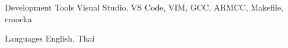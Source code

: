 \begin{cvskills}
  \cvskill
    {Development Tools} %
    {Visual Studio, VS Code, VIM, GCC, ARMCC, Makefile, cmocka} %

  \cvskill
    {Languages} %
    {English, Thai} %

\end{cvskills}
